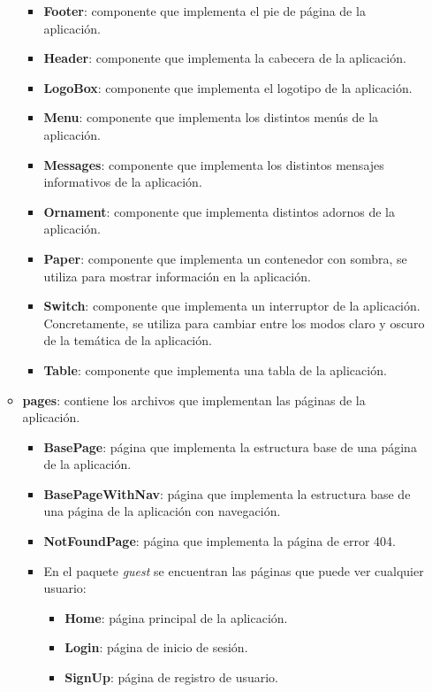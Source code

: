 \begin{itemize}
\begin{itemize}
\begin{itemize}
            \item \textbf{Footer}: componente que implementa el pie de página de la aplicación.
            \item \textbf{Header}: componente que implementa la cabecera de la aplicación.
            \item \textbf{LogoBox}: componente que implementa el logotipo de la aplicación.
            \item \textbf{Menu}: componente que implementa los distintos menús de la aplicación.
            \item \textbf{Messages}: componente que implementa los distintos mensajes informativos de la aplicación.
            \item \textbf{Ornament}: componente que implementa distintos adornos de la aplicación.
            \item \textbf{Paper}: componente que implementa un contenedor con sombra, se utiliza para mostrar información en la aplicación.
            \item \textbf{Switch}: componente que implementa un interruptor de la aplicación. Concretamente, se utiliza para cambiar entre los modos claro y oscuro de la temática de la aplicación.
            \item \textbf{Table}: componente que implementa una tabla de la aplicación.
        \end{itemize}
        \item \textbf{pages}: contiene los archivos que implementan las páginas de la aplicación.
        \begin{itemize}
            \item \textbf{BasePage}: página que implementa la estructura base de una página de la aplicación.
            \item \textbf{BasePageWithNav}: página que implementa la estructura base de una página de la aplicación con navegación.
            \item \textbf{NotFoundPage}: página que implementa la página de error 404.
            \item En el paquete \textit{guest} se encuentran las páginas que puede ver cualquier usuario:
            \begin{itemize}
                \item \textbf{Home}: página principal de la aplicación.
                \item \textbf{Login}: página de inicio de sesión.
                \item \textbf{SignUp}: página de registro de usuario.

\end{itemize}
\end{itemize}
\end{itemize}
\end{itemize}
